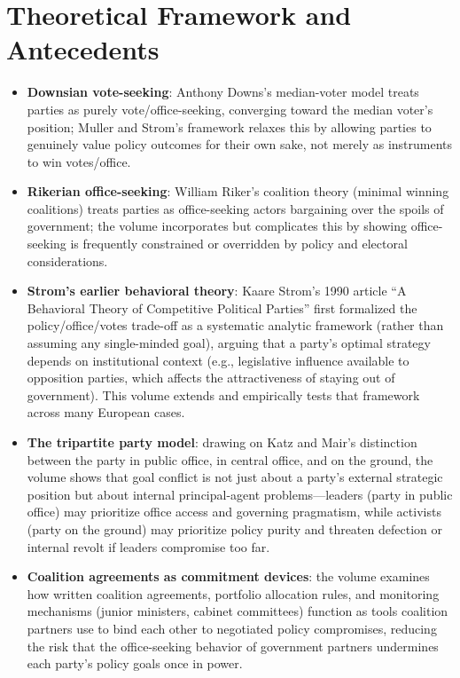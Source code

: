 \documentclass[12pt]{article}
\begin{document}
\section{Theoretical Framework and Antecedents}

\begin{itemize}[leftmargin=*, itemsep=4pt]
    \item \textbf{Downsian vote-seeking}: Anthony Downs's median-voter model treats parties as purely vote/office-seeking, converging toward the median voter's position; Muller and Strom's framework relaxes this by allowing parties to genuinely value policy outcomes for their own sake, not merely as instruments to win votes/office.
    \item \textbf{Rikerian office-seeking}: William Riker's coalition theory (minimal winning coalitions) treats parties as office-seeking actors bargaining over the spoils of government; the volume incorporates but complicates this by showing office-seeking is frequently constrained or overridden by policy and electoral considerations.
    \item \textbf{Strom's earlier behavioral theory}: Kaare Strom's 1990 article ``A Behavioral Theory of Competitive Political Parties'' first formalized the policy/office/votes trade-off as a systematic analytic framework (rather than assuming any single-minded goal), arguing that a party's optimal strategy depends on institutional context (e.g., legislative influence available to opposition parties, which affects the attractiveness of staying out of government). This volume extends and empirically tests that framework across many European cases.
    \item \textbf{The tripartite party model}: drawing on Katz and Mair's distinction between the party in public office, in central office, and on the ground, the volume shows that goal conflict is not just about a party's external strategic position but about internal principal-agent problems---leaders (party in public office) may prioritize office access and governing pragmatism, while activists (party on the ground) may prioritize policy purity and threaten defection or internal revolt if leaders compromise too far.
    \item \textbf{Coalition agreements as commitment devices}: the volume examines how written coalition agreements, portfolio allocation rules, and monitoring mechanisms (junior ministers, cabinet committees) function as tools coalition partners use to bind each other to negotiated policy compromises, reducing the risk that the office-seeking behavior of government partners undermines each party's policy goals once in power.
\end{itemize}
\end{document}
